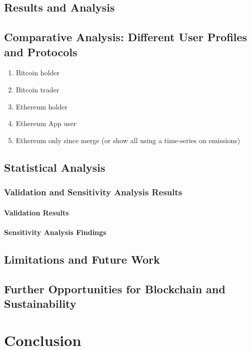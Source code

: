 \documentclass[11pt]{report}
\begin{document}
\section{Results and Analysis}
\section{Comparative Analysis: Different User Profiles and Protocols}
\begin{enumerate}
    \item Bitcoin holder
    \item Bitcoin trader
    \item Ethereum holder
    \item Ethereum App user
    \item Ethereum only since merge (or show all using a time-series on emissions)
\end{enumerate}

\section{Statistical Analysis}

\subsection{Validation and Sensitivity Analysis Results}
\subsubsection{Validation Results}
\subsubsection{Sensitivity Analysis Findings}

\section{Limitations and Future Work} \label{se:limitations}
\section{Further Opportunities for Blockchain and Sustainability}

\chapter{Conclusion}



\end{document}
